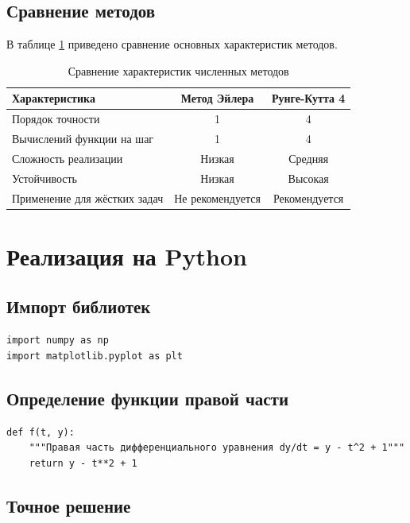 \documentclass[a4paper,12pt]{article}
\begin{document}
\subsection{Сравнение методов}

В таблице \ref{tab:comparison_methods} приведено сравнение основных характеристик методов.

\begin{table}[H]
\centering
\caption{Сравнение характеристик численных методов}
\label{tab:comparison_methods}
\begin{tabular}{|p{5cm}|c|c|}
\hline
\textbf{Характеристика} & \textbf{Метод Эйлера} & \textbf{Рунге-Кутта 4} \\ \hline
Порядок точности & 1 & 4 \\ \hline
Вычислений функции на шаг & 1 & 4 \\ \hline
Сложность реализации & Низкая & Средняя \\ \hline
Устойчивость & Низкая & Высокая \\ \hline
Применение для жёстких задач & Не рекомендуется & Рекомендуется \\ \hline
\end{tabular}
\end{table}

\newpage

\section{Реализация на Python}

\subsection{Импорт библиотек}

\begin{verbatim}
import numpy as np
import matplotlib.pyplot as plt
\end{verbatim}

\subsection{Определение функции правой части}

\begin{verbatim}
def f(t, y):
    """Правая часть дифференциального уравнения dy/dt = y - t^2 + 1"""
    return y - t**2 + 1
\end{verbatim}

\subsection{Точное решение}
\end{document}
